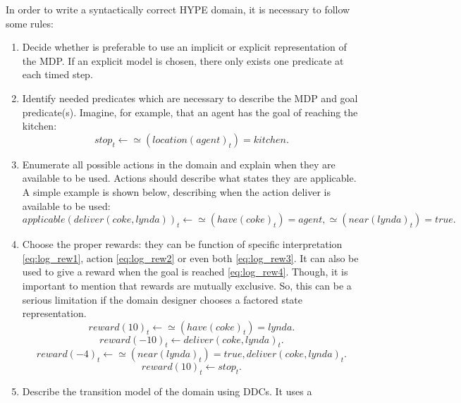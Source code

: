 In order to write a syntactically correct \gls{HYPE} domain, it is necessary to
follow some rules:
\begin{enumerate}
  \item Decide whether is preferable to use an implicit or explicit
  representation of the \gls{MDP}. If an explicit model is chosen, there only
  exists one predicate at each timed step.
  \item Identify needed predicates which are necessary to describe the \gls{MDP}
  and goal predicate(s). Imagine, for example, that an agent has the goal of
  reaching the kitchen:
  \begin{equation}
    stop_t \leftarrow \simeq(location(agent)_t) = kitchen.
  \end{equation}
  \item Enumerate all possible actions in the domain and explain when they are
  available to be used. Actions should describe what states they are
  applicable. A simple example is shown below, describing when the action
  deliver is available to be used:
  \begin{equation}
    applicable(deliver(coke, lynda))_t \leftarrow \simeq(have(coke)_t) = agent,
        \simeq(near(lynda)_t) = true.
  \end{equation}
  \item Choose the proper rewards: they can be function of specific interpretation
  \ref{eq:log_rew1}, action \ref{eq:log_rew2} or even both \ref{eq:log_rew3}. It
  can also be used to give a reward when the goal is reached \ref{eq:log_rew4}.
  Though, it is important to mention that rewards are mutually exclusive. So,
  this can be a serious limitation if the domain designer chooses a factored
  state representation.
  \begin{equation}
    reward(10)_t \leftarrow \simeq(have(coke)_t) = lynda.
    \label{eq:log_rew1}
  \end{equation}
  \begin{equation}
    reward(-10)_t \leftarrow deliver(coke, lynda)_t.
    \label{eq:log_rew2}
  \end{equation}
  \begin{equation}
    reward(-4)_t \leftarrow \simeq(near(lynda)_t) = true, deliver(coke, lynda)_t.
    \label{eq:log_rew3}
  \end{equation}
  \begin{equation}
    reward(10)_t \leftarrow stop_t.
    \label{eq:log_rew4}
  \end{equation}
  \item Describe the transition model of the domain using \glspl{DDC}. It uses a

\end{enumerate}
